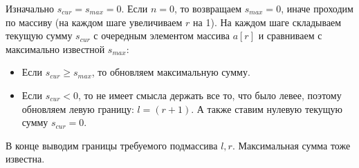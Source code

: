\begin{enumerate}
\begin{solution}
      Изначально $s_{cur} = s_{max} = 0$. Если $n = 0$, то возвращаем $s_{max} = 0$, иначе проходим по массиву (на каждом шаге увеличиваем $r$ на 1). На каждом шаге складываем текущую сумму $s_{cur}$ с очередным элементом массива $a[r]$ и сравниваем с максимально известной $s_{max}$:
      \begin{itemize}
        \item Если $s_{cur} \geq s_{max}$, то обновляем максимальную сумму.
        \item Если $s_{cur} < 0$, то не имеет смысла держать все то, что было левее, поэтому обновляем левую границу: $l = (r + 1)$. А также ставим нулевую текущую сумму $s_{cur} = 0$.
      \end{itemize}
      В конце выводим границы требуемого подмассива $l, r$. Максимальная сумма тоже известна.
    \end{solution}

    




\end{enumerate}
